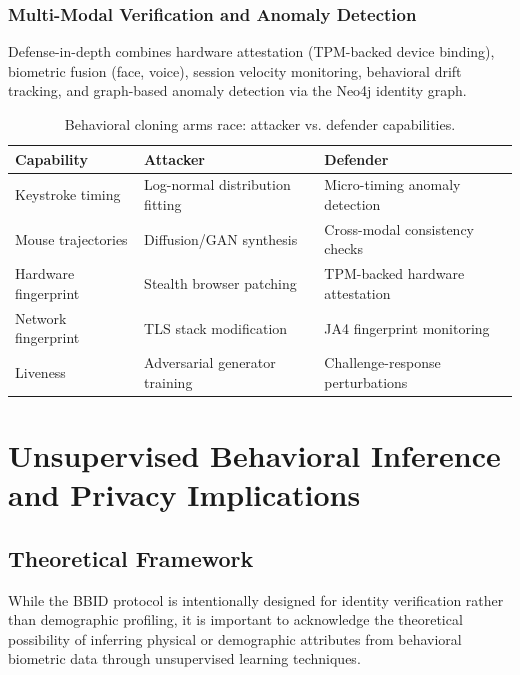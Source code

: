 \documentclass[11pt,twoside]{amsart}
\theoremstyle{plain}
\theoremstyle{definition}
\theoremstyle{remark}
\begin{document}
\subsubsection{Multi-Modal Verification and Anomaly Detection}

Defense-in-depth combines hardware attestation (TPM-backed device binding), biometric fusion (face, voice), session velocity monitoring, behavioral drift tracking, and graph-based anomaly detection via the Neo4j identity graph.

\begin{table}[htbp]
\centering
\caption{Behavioral cloning arms race: attacker vs. defender capabilities.}
\label{tab:armsrace}
\begin{tabular}{@{}p{3cm}p{4cm}p{4.5cm}@{}}
\toprule
\textbf{Capability} & \textbf{Attacker} & \textbf{Defender} \\
\midrule
Keystroke timing & Log-normal distribution fitting & Micro-timing anomaly detection \\
Mouse trajectories & Diffusion/GAN synthesis & Cross-modal consistency checks \\
Hardware fingerprint & Stealth browser patching & TPM-backed hardware attestation \\
Network fingerprint & TLS stack modification & JA4 fingerprint monitoring \\
Liveness & Adversarial generator training & Challenge-response perturbations \\
\bottomrule
\end{tabular}
\end{table}

\appendix
\section{Unsupervised Behavioral Inference and Privacy Implications}

\subsection{Theoretical Framework}

While the BBID protocol is intentionally designed for identity verification rather than demographic profiling, it is important to acknowledge the theoretical possibility of inferring physical or demographic attributes from behavioral biometric data through unsupervised learning techniques.
\end{document}
